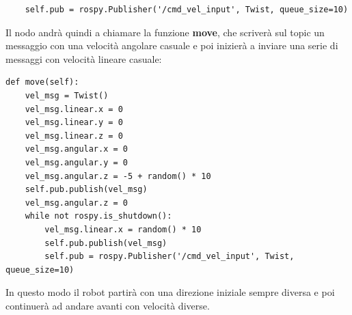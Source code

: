 \documentclass[Lau, binding=0.6cm, oneside]{sapthesis}
\begin{document}
\begin{lstlisting}
	self.pub = rospy.Publisher('/cmd_vel_input', Twist, queue_size=10)
\end{lstlisting}

Il nodo andrà quindi a chiamare la funzione \textbf{move}, che scriverà sul topic un messaggio con una velocità angolare casuale e poi inizierà a inviare una serie di messaggi con velocità lineare casuale:

\begin{lstlisting}
def move(self):
    vel_msg = Twist()
    vel_msg.linear.x = 0
    vel_msg.linear.y = 0
    vel_msg.linear.z = 0
    vel_msg.angular.x = 0
    vel_msg.angular.y = 0
    vel_msg.angular.z = -5 + random() * 10
    self.pub.publish(vel_msg)
    vel_msg.angular.z = 0
    while not rospy.is_shutdown():
        vel_msg.linear.x = random() * 10
        self.pub.publish(vel_msg)
        self.pub = rospy.Publisher('/cmd_vel_input', Twist, queue_size=10)
\end{lstlisting}
In questo modo il robot partirà con una direzione iniziale sempre diversa e poi continuerà ad andare avanti con velocità diverse.
\end{document}
